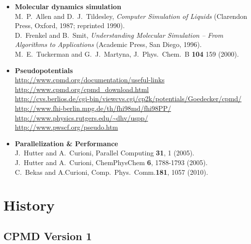 \documentclass[twoside,10pt,titlepage,a4paper]{article}
\newcommand{\htref}[2]{\href{#1}{#2}}
\newcommand{\htref}[2]{\htmladdnormallink{#2}{#1}}
\begin{document}
\begin{itemize}
\item {\bf Molecular dynamics simulation}\\
     M.~P.~Allen and D.~J.~Tildesley, {\em Computer Simulation of Liquids}
     (Clarendon Press, Oxford, 1987; reprinted 1990).\\
     D.~Frenkel and B.~Smit, {\em Understanding Molecular Simulation --
     From Algorithms to Applications} (Academic Press, San Diego, 1996).\\
     M.~E.~Tuckerman and G.~J.~Martyna, J.~Phys.~Chem.~B {\bf 104} 159 (2000).

\item {\bf Pseudopotentials}\\
\htref{http://www.cpmd.org/documentation/useful-links}%
{http://www.cpmd.org/documentation/useful-links}\\
\htref{http://www.cpmd.org/cpmd_download.html}%
{http://www.cpmd.org/cpmd\_download.html}\\
\htref{http://cvs.berlios.de/cgi-bin/viewcvs.cgi/cp2k/potentials/Goedecker/cpmd/}%
{http://cvs.berlios.de/cgi-bin/viewcvs.cgi/cp2k/potentials/Goedecker/cpmd/}\\
\htref{http://www.fhi-berlin.mpg.de/th/fhi98md/fhi98PP/}%
{http://www.fhi-berlin.mpg.de/th/fhi98md/fhi98PP/}\\
\htref{http://www.physics.rutgers.edu/~dhv/uspp/}%
{http://www.physics.rutgers.edu/\~{}dhv/uspp/}\\
\htref{http://www.pwscf.org/pseudo.htm}%
{http://www.pwscf.org/pseudo.htm}

\item{\bf Parallelization \& Performance}\\
     J.~Hutter and A.~Curioni,
     Parallel Computing {\bf 31}, 1 (2005). \\
     J.~Hutter and A.~Curioni,
     ChemPhysChem {\bf 6}, 1788-1793 (2005). \\
     C.~Bekas and A.Curioni,
     Comp.~Phys.~Comm.{\bf 181}, 1057 (2010). \\
\end{itemize}

\clearpage

\section{History}\label{intro}

\subsection{CPMD Version 1}
\end{document}
